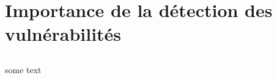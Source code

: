 \chapter{Importance de la détection des vulnérabilités}
    \section{}
        \subsection{}
            \subsubsection{}
    \newpage
    \section{}
    some text